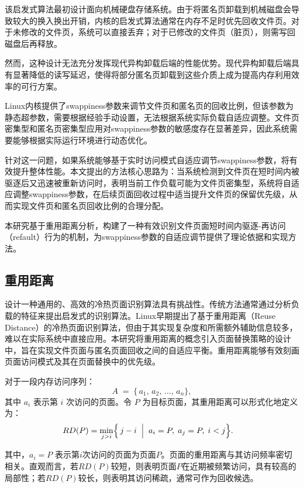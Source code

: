 该启发式算法最初设计面向机械硬盘存储系统。由于将匿名页卸载到机械磁盘会导致较大的换入换出开销，内核的启发式算法通常在内存不足时优先回收文件页。对于未修改的文件页，系统可以直接丢弃；对于已修改的文件页（脏页），则需写回磁盘后再释放。

然而，这种设计无法充分发挥现代异构卸载后端的性能优势。现代异构卸载后端具有显著降低的读写延迟，使得将部分匿名页卸载到这些介质上成为提高内存利用效率的可行方案。

Linux内核提供了swappiness参数来调节文件页和匿名页的回收比例，但该参数为静态超参数，需要根据经验手动设置，无法根据系统实际负载自适应调整。文件页密集型和匿名页密集型应用对swappiness参数的敏感度存在显著差异，因此系统需要能够根据实际运行环境进行动态优化。

针对这一问题，如果系统能够基于实时访问模式自适应调节swappiness参数，将有效提升整体性能。本文提出的方法核心思路为：当系统检测到文件页在短时间内被驱逐后又迅速被重新访问时，表明当前工作负载可能为文件页密集型，系统将自适应调整swappiness参数，在后续页面回收过程中适当提升文件页的保留优先级，从而实现文件页和匿名页回收比例的合理分配。

本研究基于重用距离分析，构建了一种有效识别文件页面短时间内驱逐-再访问（refault）行为的机制，为swappiness参数的自适应调节提供了理论依据和实现方法。

\subsection{重用距离}

设计一种通用的、高效的冷热页面识别算法具有挑战性。传统方法通常通过分析负载的特征来提出启发式的识别算法。Linux早期提出了基于重用距离（Reuse Distance）的冷热页面识别算法，但由于其实现复杂度和所需额外辅助信息较多，难以在实际系统中直接应用。本研究将重用距离的概念引入页面替换策略的设计中，旨在实现文件页面与匿名页面回收之间的自适应平衡。重用距离能够有效刻画页面访问模式及其在页面替换中的优先级。

对于一段内存访问序列：
\[
  A \;=\;\{\,a_1,\,a_2,\,\dots,\,a_n\},
\]
其中 \(a_i\) 表示第 \(i\) 次访问的页面。令 \(P\) 为目标页面，其重用距离可以形式化地定义为：
\begin{align}
\label{eq:rd_def}
  RD(P) 
  &= 
  \min_{j>i}\Bigl\{\,j - i
    \;\Bigm|\;
    a_i = P,\;
    a_j = P,\;
    i < j
  \Bigr\}.
\end{align}

其中，\(a_i=P\) 表示第\(i\)次访问的页面为页面\(P\)。页面的重用距离与其访问频率密切相关。直观而言，若\(RD(P)\)较短，则表明页面\(P\)在近期被频繁访问，具有较高的局部性；若\(RD(P)\)较长，则表明其访问稀疏，通常可作为回收候选。

